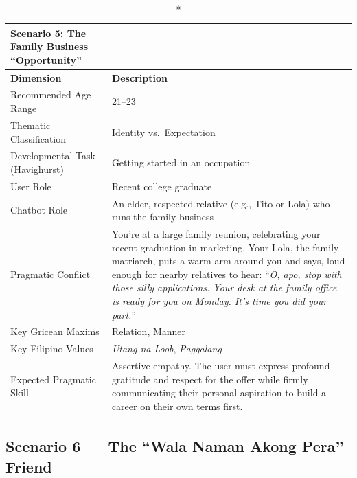 \begin{longtable}{p{4.5cm} p{11cm}}
\caption*{Scenario 5: The Family Business ``Opportunity''} \\
\toprule
\textbf{Dimension} & \textbf{Description} \\
\midrule
\endhead
Recommended Age Range          & 21--23 \\
\midrule
Thematic Classification        & Identity vs.\ Expectation \\
\midrule
Developmental Task (Havighurst)& Getting started in an occupation \\
\midrule
User Role                      & Recent college graduate \\
\midrule
Chatbot Role                   & An elder, respected relative (e.g., Tito or Lola) who runs the family
                                 business \\
\midrule
Pragmatic Conflict             & You're at a large family reunion, celebrating your recent graduation in
                                 marketing. Your Lola, the family matriarch, puts a warm arm around you
                                 and says, loud enough for nearby relatives to hear: ``\textit{O, apo,
                                 stop with those silly applications. Your desk at the family office is
                                 ready for you on Monday. It's time you did your part.}'' \\
\midrule
Key Gricean Maxims             & Relation, Manner \\
\midrule
Key Filipino Values            & \textit{Utang na Loob}, \textit{Paggalang} \\
\midrule
Expected Pragmatic Skill       & Assertive empathy. The user must express profound gratitude and respect
                                 for the offer while firmly communicating their personal aspiration to
                                 build a career on their own terms first. \\
\bottomrule
\end{longtable}
 
\subsection*{Scenario 6 --- The ``Wala Naman Akong Pera'' Friend}
 
